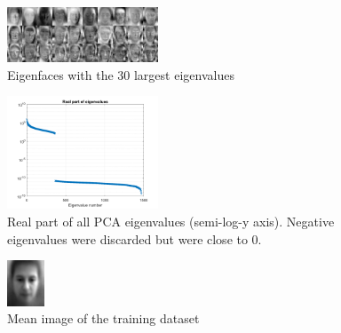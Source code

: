 \documentclass[10pt,technote]{IEEEtran}
\begin{document}
\begin{figure}[htb!]
    \centering
    \includegraphics[width=0.4\textwidth]{../results/ex1a/eigenfaces.png}
    \caption{Eigenfaces with the 30 largest eigenvalues}
    \label{fig:eigfaces1}
\end{figure}

\begin{figure}[htb!]
    \centering
    \includegraphics[width=0.4\textwidth]{../results/ex1a/eigenvalues.png}
    \caption{Real part of all PCA eigenvalues (semi-log-y axis). Negative eigenvalues were discarded but were close to 0.}
    \label{fig:eigvals1}
\end{figure}

\begin{figure}[htb!]
    \centering
    \includegraphics[width=0.1\textwidth]{../results/ex1a/mean_image.png}
    \caption{Mean image of the training dataset}
    \label{fig:mean_im1}
\end{figure}
\end{document}
